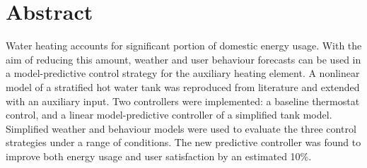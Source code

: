 \chapter{Abstract}

Water heating accounts for significant portion of domestic energy usage.
With the aim of reducing this amount, weather and user behaviour forecasts can be used in a model-predictive control strategy for the auxiliary heating element.
A nonlinear model of a stratified hot water tank was reproduced from literature and extended with an auxiliary input.
Two controllers were implemented: a baseline thermostat control, and a linear model-predictive controller of a simplified tank model.
Simplified weather and behaviour models were used to evaluate the three control strategies under a range of conditions.
The new predictive controller was found to improve both energy usage and user satisfaction by an estimated 10\%.
